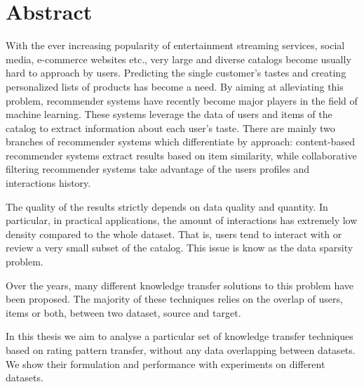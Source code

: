 \chapter*{Abstract}

With the ever increasing popularity of entertainment streaming services, social media, e-commerce websites etc., very large and diverse catalogs become usually hard to approach by users. Predicting the single customer's tastes and creating personalized lists of products has become a need.
By aiming at alleviating this problem, recommender systems have recently become major players in the field of machine learning.
These systems leverage the data of users and items of the catalog to extract information about each user's taste.
There are mainly two branches of recommender systems which differentiate by approach:
content-based recommender systems extract results based on item similarity, while collaborative filtering recommender systems take advantage of the users profiles and interactions history.

The quality of the results strictly depends on data quality and quantity. In particular, in practical applications, the amount of interactions has extremely low density compared to the whole dataset. That is, users tend to interact with or review a very small subset of the catalog. This issue is know as the data sparsity problem.

Over the years, many different knowledge transfer solutions to this problem have been proposed. The majority of these techniques relies on the overlap of users, items or both, between two dataset, source and target.

In this thesis we aim to analyse a particular set of knowledge transfer techniques based on rating pattern transfer, without any data overlapping between datasets. We show their formulation and performance with experiments on different datasets.